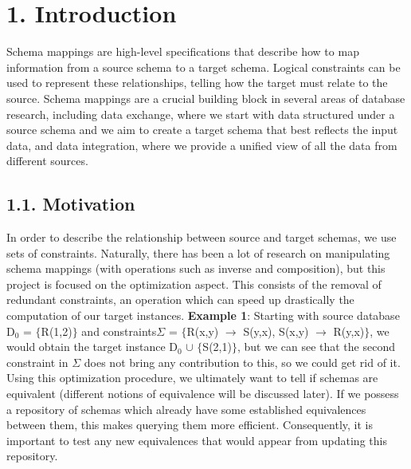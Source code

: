 \documentclass[11pt, a4paper, dvipsnames]{article}
\begin{document}
\newpage

\setcounter{secnumdepth}{-1}
\setcounter{tocdepth}{2}
\tableofcontents

\newpage

\section{1. Introduction}
Schema mappings are high-level specifications that describe how to map information from a source schema to a target schema. Logical constraints can be used to represent these relationships, telling how the target must relate to the source. Schema mappings are a crucial building block in several areas of database research, including data exchange\cite{dataexchange}, where we start with data structured under a source schema and we aim to create a target schema that best reflects the input data, and data integration\cite{dataintegration}, where we provide a unified view of all the data from different sources.

\subsection{1.1. Motivation}
In order to describe the relationship between source and target schemas, we use sets of constraints. Naturally, there has been a lot of research on manipulating schema mappings (with operations such as inverse and composition), but this project is focused on the optimization aspect. This consists of the removal of redundant constraints, an operation which can speed up drastically the computation of our target instances. \newline
\textbf{Example 1}: Starting with source database D$_{0}$ = $\{$R(1,2)$\}$ and constraints\newline $\Sigma$ = $\{$R(x,y) $\rightarrow$ S(y,x), S(x,y) $\rightarrow$ R(y,x)$\}$, we would obtain the target instance D$_{0}$ $\cup$ $\{$S(2,1)$\}$, but we can see that the second constraint in $\Sigma$ does not bring any contribution to this, so we could get rid of it.\newline
Using this optimization procedure, we ultimately want to tell if schemas are equivalent (different notions of equivalence will be discussed later). If we possess a repository of schemas which already have some established equivalences between them, this makes querying them more efficient. Consequently, it is important to test any new equivalences that would appear from updating this repository. 
\end{document}
